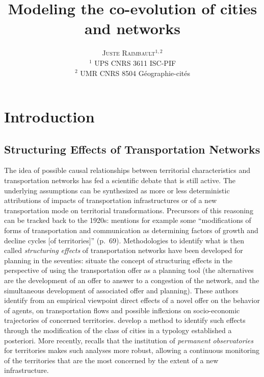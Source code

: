 \documentclass[11pt]{article}
\newcommand{\noun}[1]{\textsc{#1}}
\begin{document}
\title{Modeling the co-evolution of cities and networks}
\author{\noun{Juste Raimbault}$^{1,2}$\\
$^1$ UPS CNRS 3611 ISC-PIF\\
$^2$ UMR CNRS 8504 G{\'e}ographie-cit{\'e}s
}
\date{}


\maketitle

\justify



\section{Introduction}

\subsection{Structuring Effects of Transportation Networks}

The idea of possible causal relationships between territorial characteristics and transportation networks has fed a scientific debate that is still active. The underlying assumptions can be synthesized as more or less deterministic attributions of impacts of transportation infrastructures or of a new transportation mode on territorial transformations. Precursors of this reasoning can be tracked back to the 1920s: \cite{burgess1925city} mentions for example some ``modifications of forms of transportation and communication as determining factors of growth and decline cycles [of territories]'' (p.~69). Methodologies to identify what is then called \emph{structuring effects} of transportation networks have been developed for planning in the seventies: \cite{bonnafous1974methodologies} situate the concept of structuring effects in the perspective of using the transportation offer as a planning tool (the alternatives are the development of an offer to answer to a congestion of the network, and the simultaneous development of associated offer and planning). These authors identify from an empirical viewpoint direct effects of a novel offer on the behavior of agents, on transportation flows and possible inflexions on socio-economic trajectories of concerned territories. \cite{bonnafous1974detection} develop a method to identify such effects through the modification of the class of cities in a typology established a posteriori. More recently, \cite{bonnafous2014observatoires} recalls that the institution of \emph{permanent observatories} for territories makes such analyses more robust, allowing a continuous monitoring of the territories that are the most concerned by the extent of a new infrastructure.
\end{document}
